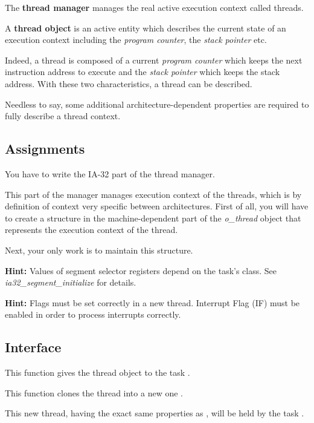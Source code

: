 The \textbf{thread manager} manages the real active execution
context called threads.

A \textbf{thread object} is an active entity which describes the
current state of an execution context including the
\textit{program counter}, the \textit{stack pointer} etc.

Indeed, a thread is composed of a current \textit{program counter}
which keeps the next instruction address to execute and the
\textit{stack pointer} which keeps the stack address. With these
two characteristics, a thread can be described.

Needless to say, some additional architecture-dependent properties
are required to fully describe a thread context.

\subsection*{Assignments}

You have to write the IA-32 part of the thread manager.

This part of the manager manages execution context of the threads,
which is by definition of context very specific between
architectures. First of all, you will have to create a structure
in the machine-dependent part of the \emph{o\_thread} object that
represents the execution context of the thread.

Next, your only work is to maintain this structure.

\textbf{Hint:} Values of segment selector registers depend on the
task's class. See \emph{ia32\_segment\_initialize} for details.

\textbf{Hint:} Flags must be set correctly in a new
thread. Interrupt Flag (IF) must be enabled in order to process
interrupts correctly.

\subsection*{Interface}

{
  This function gives the thread object  to the
  task .
}

{
  This function clones the thread  into a new one
  .

  This new thread, having the exact same properties as ,
  will be held by the task .
}

